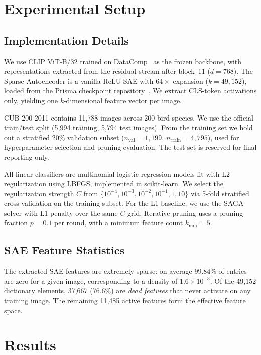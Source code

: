 \section{Experimental Setup}

\subsection{Implementation Details}

We use CLIP ViT-B/32 trained on DataComp~\cite{gadre2024datacomp} as the frozen backbone, with representations extracted from the residual stream after block~11 ($d = 768$). The Sparse Autoencoder is a vanilla ReLU SAE with $64\times$ expansion ($k = 49{,}152$), loaded from the Prisma checkpoint repository~\cite{joseph2024prisma}. We extract CLS-token activations only, yielding one $k$-dimensional feature vector per image.

CUB-200-2011 contains 11{,}788 images across 200 bird species. We use the official train/test split (5{,}994 training, 5{,}794 test images). From the training set we hold out a stratified 20\% validation subset ($n_\mathrm{val} = 1{,}199$, $n_\mathrm{train} = 4{,}795$), used for hyperparameter selection and pruning evaluation. The test set is reserved for final reporting only.

All linear classifiers are multinomial logistic regression models fit with L2 regularization using LBFGS, implemented in scikit-learn. We select the regularization strength $C$ from $\{10^{-4}, 10^{-3}, 10^{-2}, 10^{-1}, 1, 10\}$ via 5-fold stratified cross-validation on the training subset. For the L1 baseline, we use the SAGA solver with L1 penalty over the same $C$ grid. Iterative pruning uses a pruning fraction $p = 0.1$ per round, with a minimum feature count $k_\mathrm{min} = 5$.

\subsection{SAE Feature Statistics}

The extracted SAE features are extremely sparse: on average 99.84\% of entries are zero for a given image, corresponding to a density of $1.6 \times 10^{-3}$. Of the 49{,}152 dictionary elements, 37{,}667 (76.6\%) are \emph{dead features} that never activate on any training image. The remaining 11{,}485 active features form the effective feature space.

\section{Results}

